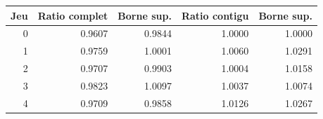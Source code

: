 \begin{tabular}{rrrrr}
\toprule Jeu & Ratio complet & Borne sup. & Ratio contigu & Borne sup.\\\midrule
0 & 0.9607 & 0.9844 & 1.0000 & 1.0000\\
1 & 0.9759 & 1.0001 & 1.0060 & 1.0291\\
2 & 0.9707 & 0.9903 & 1.0004 & 1.0158\\
3 & 0.9823 & 1.0097 & 1.0037 & 1.0074\\
4 & 0.9709 & 0.9858 & 1.0126 & 1.0267\\
\bottomrule
\end{tabular}
